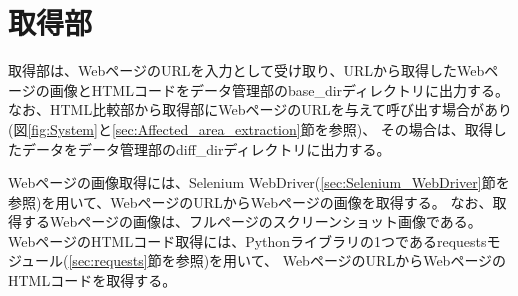 

\section{取得部}\label{sec:Web_data_get_section}
取得部は、WebページのURLを入力として受け取り、URLから取得したWebページの画像とHTMLコードをデータ管理部のbase\_dirディレクトリに出力する。
なお、HTML比較部から取得部にWebページのURLを与えて呼び出す場合があり(図\ref{fig:System}と\ref{sec:Affected_area_extraction}節を参照)、
その場合は、取得したデータをデータ管理部のdiff\_dirディレクトリに出力する。
\par
Webページの画像取得には、Selenium WebDriver(\ref{sec:Selenium_WebDriver}節を参照)を用いて、WebページのURLからWebページの画像を取得する。
なお、取得するWebページの画像は、フルページのスクリーンショット画像である。
WebページのHTMLコード取得には、Pythonライブラリの1つであるrequestsモジュール(\ref{sec:requests}節を参照)を用いて、
WebページのURLからWebページのHTMLコードを取得する。

